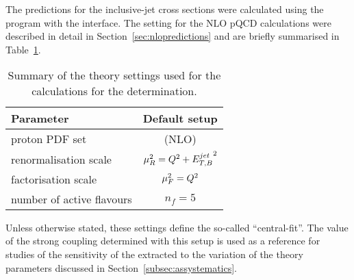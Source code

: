 The predictions for the inclusive-jet cross sections were calculated using the \nlojet program with the \fastnlo interface. The setting for the NLO pQCD calculations were described in detail in Section~\ref{sec:nlopredictions} and are briefly summarised in Table~\ref{tab:nlosettings}.
\begin{table}[h]
\centering
\begin{tabular}{l|c}
Parameter  & Default setup \\ 
\hline \hline proton PDF set & \herapdf1.5 (NLO) \\
\hline renormalisation scale & $\mu_R^2=\mbox{${Q^2}$} + \mbox{$E_{T,B}^{jet}$}^2$ \\ 
\hline factorisation scale          & $\mu_F^2=\mbox{${Q^2}$} $ \\ 
\hline number of active flavours    & $n_f = 5 $ \\ 
\end{tabular} 
\caption{Summary of the theory settings used for the calculations for the \as determination.}
\label{tab:nlosettings}
\end{table}
Unless otherwise stated, these settings define the so-called ``central-fit''. The value of the strong coupling determined with this setup is used as a reference for studies of the sensitivity of the extracted \asz to the variation of the theory parameters discussed in Section~\ref{subsec:assystematics}.

